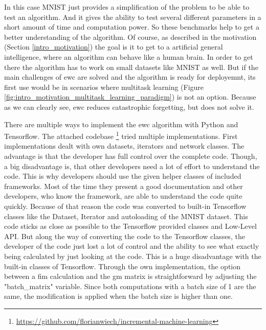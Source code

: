 In this case MNIST just provides a simplification of the problem to be able to test an algorithm.
And it gives the ability to test several different parameters in a short amount of time and computation power.
So these benchmarks help to get a better understanding of the algorithm.
Of course, as described in the motivation (Section \ref{intro_motivation}) the goal is it to get to a artificial general intelligence, where an algorithm can behave like a human brain.
In order to get there the algorithm has to work on small datasets like MNIST as well.
But if the main challenges of \acrshort{ewc} are solved and the algorithm is ready for deployemnt, its first use would be in scenarios where multitask learning (Figure \ref{fig:intro_motivation_multitask_learning_paradigm}) is not an option.
Because as we can clearly see, \acrshort{ewc} reduces catastrophic forgetting, but does not solve it.

There are multiple ways to implement the \acrshort{ewc} algorithm with Python and Tensorflow.
The attached codebase \footnote{\url{https://github.com/florianwiech/incremental-machine-learning}} tried multiple implementations.
First implementations dealt with own datasets, iterators and network classes.
The advantage is that the developer has full control over the complete code.
Though, a big disadvantage is, that other developers need a lot of effort to understand the code.
This is why developers should use the given helper classes of included frameworks.
Most of the time they present a good documentation and other developers, who know the framework, are able to understand the code quite quickly.
Because of that reason the code was converted to built-in Tensorflow classes like the Dataset, Iterator and autoloading of the MNIST dataset.
This code sticks as close as possible to the Tensorflow provided classes and Low-Level API.
But along the way of converting the code to the Tensorflow classes, the developer of the code just lost a lot of control and the ability to see what exactly being calculated by just looking at the code.
This is a huge disadvantage with the built-in classes of Tensorflow.
\newline
Through the own implementation, the option between a \acrshort{fim} calculation and the \acrshort{gm} matrix is straightforward by adjusting the "batch\_matrix" variable.
Since both computations with a batch size of 1 are the same, the modification is applied when the batch size is higher than one.

